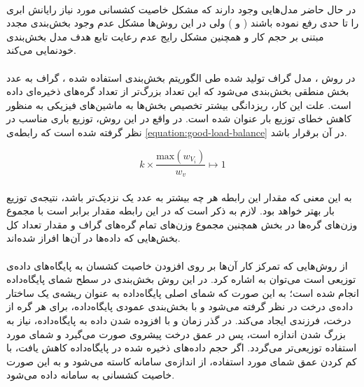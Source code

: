 \paragraph*{}
در حال حاضر مدل‌هایی وجود دارند که مشکل خاصیت کشسانی مورد نیاز رایانش ابری را تا حدی رفع نموده باشند 
(\cite{elastras-2010}
و
\cite{elasca-2013})
ولی در این روش‌ها مشکل عدم وجود بخش‌بندی مجدد مبتنی بر حجم کار و همچنین مشکل رایج عدم رعایت تابع هدف مدل بخش‌بندی خودنمایی می‌کند.

\paragraph*{}
در روش
\cite{kamal-2016}،
مدل گراف تولید شده طی الگوریتم بخش‌بندی استفاده شده
\cite{metis-1996}،
گراف به
عدد بخش منطقی
بخش‌بندی می‌شود که این تعداد بزرگ‌تر از تعداد گره‌های ذخیره‌ای داده است. علت این کار، ریزدانگی بیشتر تخصیص بخش‌ها به ماشین‌های فیزیکی به منظور کاهش خطای توزیع بار
عنوان شده است. در واقع در این روش، توزیع باری مناسب در نظر گرفته شده است که رابطه‌ی
\ref{equation:good-load-balance}
در آن برقرار باشد.
\begin{latin}
	\begin{equation} \label{equation:good-load-balance}
		k \times \frac{\text{max}( w_{V_{i}} )}{w_{v}}
		\mapsto
		1
	\end{equation}
\end{latin}

\paragraph*{}
به این معنی که مقدار این رابطه هر چه بیشتر به عدد یک نزدیک‌تر باشد، نتیجه‌ی توزیع بار بهتر خواهد بود. لازم به ذکر است که در این رابطه مقدار
برابر است با مجموع وزن‌های گره‌ها در بخش
همچنین
مجموع وزن‌های تمام گره‌های گراف و مقدار
تعداد کل بخش‌هایی که داده‌ها در آن‌ها افراز شده‌اند.

\paragraph*{}
از روش‌هایی که تمرکز کار آن‌ها بر روی افزودن خاصیت کشسان به پایگاه‌های داده‌ی توزیعی است می‌توان به
\cite{elastras-2010}
اشاره کرد. در این روش بخش‌بندی در سطح شمای پایگاه‌داده
انجام شده است؛ به این صورت که شمای اصلی پایگاه‌داده به عنوان ریشه‌ی یک ساختار داده‌ی درخت در نظر گرفته می‌شود و با بخش‌بندی عمودی پایگاه‌داده، برای هر گره از درخت، فرزندی ایجاد می‌کند. در گذر زمان و با افزوده شدن داده به پایگاه‌داده، نیاز به بزرگ شدن اندازه است، پس در عمق درخت پیشروی صورت می‌گیرد و شمای مورد استفاده توزیعی‌تر می‌گردد. اگر حجم داده‌های ذخیره شده در پایگاه‌داده کاهش یافت، با کم کردن عمق شمای مورد استفاده، از اندازه‌ی سامانه کاسته می‌شود و به این صورت خاصیت کشسانی به سامانه داده می‌شود.

